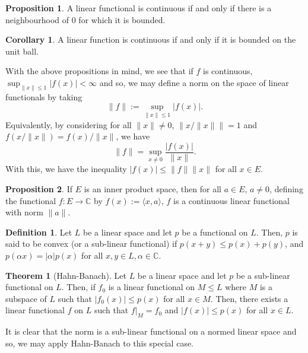 \documentclass[]{article}
\theoremstyle{definition}
\newtheorem{theorem}{Theorem}
\newtheorem{corollary}{Corollary}[theorem]
\theoremstyle{definition}
\newtheorem{definition}{Definition}[section]
\newtheorem{proposition}{Proposition}[section]
\begin{document}
\begin{proposition}
  A linear functional is continuous if and only if there is a neighbourhood of 
  0 for which it is bounded.
\end{proposition}

\begin{corollary}
  A linear function is continuous if and only if it is bounded on the unit ball.
\end{corollary}

With the above propositions in mind, we see that if \(f\) is continuous, 
\(\sup_{\|x\| \le 1} |f(x)| < \infty\) and so, we may define a norm on the space 
of linear functionals by taking 
\[\|f\| := \sup_{\|x\| \le 1} |f(x)|.\]
Equivalently, by considering for all \(\|x\| \neq 0\), \(\|x / \|x\|\| = 1\) 
and \(f(x/\|x\|) = f(x) / \|x\|\), we have 
\[\|f\| = \sup_{x \neq 0} \frac{|f(x)|}{\|x\|}.\]
With this, we have the inequality \(|f(x)| \le \|f\| \|x\|\) for all \(x \in E\).

\begin{proposition}
  If \(E\) is an inner product space, then for all \(a \in E\), \(a \neq 0\), 
  defining the functional \(f : E \to \mathbb{C}\) by 
  \(f(x) := \langle x, a \rangle\), \(f\) is a continuous linear functional with 
  norm \(\|a\|\).
\end{proposition}

\begin{definition}
  Let \(L\) be a linear space and let \(p\) be a functional on \(L\). Then, 
  \(p\) is said to be convex (or a sub-linear functional) if 
  \(p(x + y) \le p(x) + p(y)\), and \(p(\alpha x) = |\alpha| p(x)\) for all 
  \(x, y \in L, \alpha \in \mathbb{C}\).
\end{definition}

\begin{theorem}[Hahn-Banach]
  Let \(L\) be a linear space and let \(p\) be a sub-linear functional on \(L\). 
  Then, if \(f_0\) is a linear functional on \(M \le L\) where \(M\) is a subspace 
  of \(L\) such that \(|f_0(x)| \le p(x)\) for all \(x \in M\). Then, there exists 
  a linear functional \(f\) on \(L\) such that \(f|_{M} = f_0\) and 
  \(|f(x)| \le p(x)\) for all \(x \in L\).
\end{theorem}

It is clear that the norm is a sub-linear functional on a normed linear space 
and so, we may apply Hahn-Banach to this special case.
\end{document}
